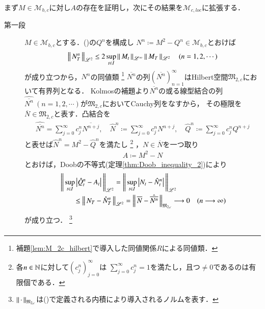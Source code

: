	\begin{prf}
		まず$M \in \mathcal{M}_{b,c}$に対し$A$の存在を証明し，次にその結果を$\mathcal{M}_{c,loc}$に拡張する．
		\begin{description}
			\item[第一段]
				$M \in \mathcal{M}_{b,c}$とする．()の$Q^n$を構成し
				$N^n \coloneqq M^2 - Q^n \in \mathcal{M}_{b,c}$とおけば
				\begin{align}
					\left\|\, N_T^n\, \right\|_{\mathscr{L}^2} \leq 2 \operatorname*{sup}_{t \in I} \left\|\, M_t\, \right\|_{\mathscr{L}^\infty} \left\|\, M_T\, \right\|_{\mathscr{L}^2} \quad (n=1,2,\cdots)
				\end{align}
				が成り立つから，$N^n$の同値類
				\footnote{
					補題\ref{lem:M_2c_hilbert}で導入した同値関係$R$による同値類．
				}
				$\overline{N^n}$の列$(\overline{N^n})_{n=1}^{\infty}$はHilbert空間$\mathfrak{M}_{2,c}$において有界列となる．
				Kolmosの補題より$\overline{N^n}$の或る線型結合の列$\hat{\overline{N^n}}\ (n=1,2,\cdots)$が$\mathfrak{M}_{2,c}$においてCauchy列をなすから，
				その極限を$\overline{N} \in \mathfrak{M}_{2,c}$と表す．凸結合を
				\begin{align}
					\hat{\overline{N^n}} = \sum_{j=0}^{\infty} c^n_j \overline{N^{n+j}}, \quad
					\hat{N}^n \coloneqq \sum_{j=0}^{\infty} c^n_j N^{n+j}, \quad
					\hat{Q}^n \coloneqq \sum_{j=0}^{\infty} c^n_j Q^{n+j}
				\end{align}
				と表せば$\hat{N}^n = M^2 - \hat{Q}^n$を満たし
				\footnote{
					各$n \in \mathbb{N}$に対して$(c^n_j)_{j=0}^{\infty}$は
					$\sum_{j=0}^{\infty} c^n_j = 1$を満たし，且つ$\neq 0$であるのは有限個である．
				}
				，$N \in \overline{N}$を一つ取り
				\begin{align}
					A \coloneqq M^2 - N \label{eq:thm_quadratic_variation_0}
				\end{align}
				とおけば，Doobの不等式(定理\ref{thm:Doob_inequality_2})により
				\begin{align}
					&\left\|\, \operatorname*{sup}_{t \in I} \left| \hat{Q}_t^n - A_t \right|\, \right\|_{\mathscr{L}^2}
					= \left\|\, \operatorname*{sup}_{t \in I} \left| N_t - \hat{N}_t^n \right|\, \right\|_{\mathscr{L}^2} \\
					&\qquad \leq \left\|\, N_T - \hat{N}_T^n\, \right\|_{\mathscr{L}^2}
					= \left\|\, \overline{N} - \hat{\overline{N^n}}\, \right\|_{\mathfrak{M}_{2,c}} \longrightarrow 0 \quad (n \longrightarrow \infty) 
				\end{align}
				が成り立つ．
				\footnote{
					$\left\|\, \cdot\, \right\|_{\mathfrak{M}_{2,c}}$は()で定義される内積により導入されるノルムを表す．
				}
				\begin{align}

\end{align}
\end{description}
\end{prf}
